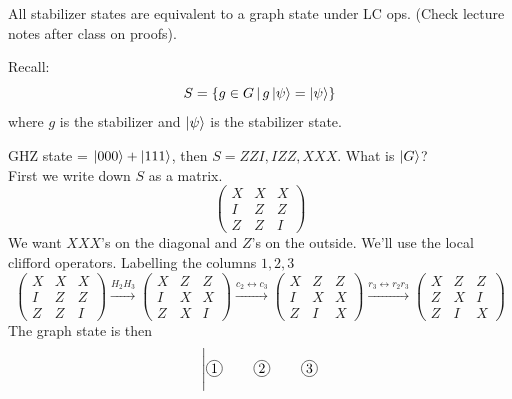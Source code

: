 \begin{claim}
    All stabilizer states are equivalent to a graph state under LC ops. (Check lecture notes after class on proofs). 
\end{claim}
Recall:
\begin{equation}
    S = \{g \in G \,|\, g\ket{\psi} = \ket{\psi} \}
\end{equation}
where $g$ is the stabilizer and $\ket{\psi}$ is the stabilizer state.
\begin{example}
    GHZ state = $\ket{000} + \ket{111}$, then $S = ZZI, IZZ, XXX$. What is $\ket{G}$?\\
    First we write down $S$ as a matrix. 
    \begin{equation}
        \begin{pmatrix}
            X &X &X \\
            I & Z& Z \\
            Z & Z& I 
        \end{pmatrix}
    \end{equation}
    We want $XXX$'s on the diagonal and $Z$'s on the outside. We'll use the local clifford operators. Labelling the columns $1,2,3$
    \begin{equation}
        \begin{pmatrix}
            X &X &X \\
            I & Z& Z \\
            Z & Z& I 
        \end{pmatrix}
        \xrightarrow{H_2H_3}
        \begin{pmatrix}
            X &Z & Z \\
            I & X& X \\
            Z & X& I 
        \end{pmatrix}
        \xrightarrow{c_2\leftrightarrow c_3}
        \begin{pmatrix}
            X &Z & Z \\
            I & X& X \\
            Z & I& X 
        \end{pmatrix}
        \xrightarrow{r_3\leftrightarrow r_2r_3} 
        \begin{pmatrix}
            X &Z & Z \\
            Z & X& I \\
            Z & I& X 
        \end{pmatrix}
    \end{equation}
    The graph state is then 
    \begin{equation}
        \Bigg| \begin{tikzpicture}[baseline=(n2.base)]
      \node[circle,draw,inner sep=1.2pt] (n1) at (0,0) {$1$};
      \node[circle,draw,inner sep=1.2pt] (n2) at (1.2,0) {$2$};
      \node[circle,draw,inner sep=1.2pt] (n3) at (2.4,0) {$3$};
    

\end{tikzpicture}
\end{equation}
\end{example}

